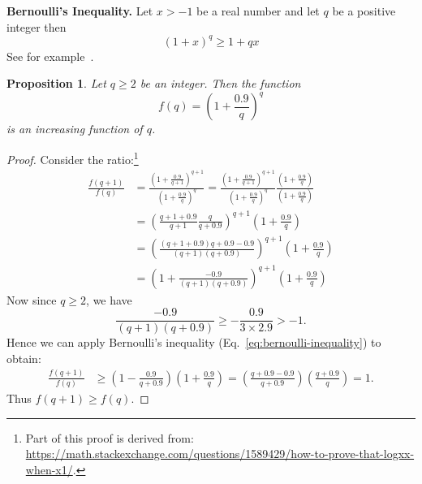 \documentclass[pdflatex,sn-mathphys-num]{sn-jnl}
\newcommand{\descr}[1]{\vspace{0.2cm} \noindent \textbf{#1}}
\newtheorem{proposition}{Proposition}
\theoremstyle{definition}
\begin{document}
\descr{Bernoulli's Inequality.} Let $x > -1$ be a real number and let $q$ be a positive integer then 
\begin{equation}
\label{eq:bernoulli-inequality}
(1 + x)^q \geq 1 + qx    
\end{equation}
See for example~\cite{bernoulli-inequality}. 
\begin{proposition}
\label{prop:increasing-function-q}
Let $q \geq 2$ be an integer. Then the function
\[
f(q) = \left( 1 + \frac{0.9}{q}\right)^q
\]
is an increasing function of $q$. 
\end{proposition}
\begin{proof}
Consider the ratio:\footnote{Part of this proof is derived from: \url{https://math.stackexchange.com/questions/1589429/how-to-prove-that-logxx-when-x1/}.}
\begin{align*}
    \frac{f(q + 1)}{f(q)} &= \frac{\left( 1 + \frac{0.9}{q+1}\right)^{q+1}}{\left( 1 + \frac{0.9}{q}\right)^q} = \frac{\left( 1 + \frac{0.9}{q+1}\right)^{q+1}}{\left( 1 + \frac{0.9}{q}\right)^q} \frac{\left( 1 + \frac{0.9}{q}\right)}{\left( 1 + \frac{0.9}{q}\right)} \\
    &= \left( \frac{q + 1 + 0.9}{q+1} \frac{q}{q + 0.9} \right)^{q+1} \left( 1 + \frac{0.9}{q}\right)\\
    &= \left( \frac{(q + 1 + 0.9)q + 0.9 - 0.9}{(q+1)(q+0.9)}\right)^{q+1} \left( 1 + \frac{0.9}{q}\right)\\
    &= \left( 1 + \frac{- 0.9}{(q+1)(q+0.9)}\right)^{q+1} \left( 1 + \frac{0.9}{q}\right)
\end{align*}
Now since $q \geq 2$, we have 
\[
\frac{- 0.9}{(q+1)(q+0.9)} \geq - \frac{0.9}{3 \times 2.9} > -1.
\]
Hence we can apply Bernoulli's inequality (Eq.~\ref{eq:bernoulli-inequality}) to obtain:
\begin{align*}
    \frac{f(q + 1)}{f(q)} &\geq \left( 1 - \frac{0.9}{q+0.9}\right) \left( 1 + \frac{0.9}{q}\right) = \left( \frac{q + 0.9 - 0.9}{q+0.9}\right) \left( \frac{q + 0.9}{q}\right) = 1.
\end{align*}
Thus $f(q+1) \geq f(q)$. 
\end{proof}





\end{document}
